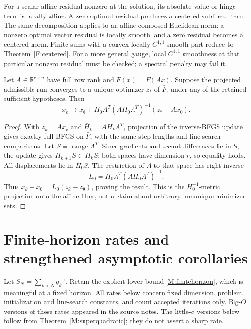 For a scalar affine residual nonzero at the solution, its absolute-value or hinge term is locally affine. A zero optimal residual produces a centered sublinear term. The same decomposition applies to an affine-composed Euclidean norm: a nonzero optimal vector residual is locally smooth, and a zero residual becomes a centered norm. Finite sums with a convex locally $C^{1,1}$ smooth part reduce to Theorem~\ref{F:centered}. For a more general gauge, local $C^{1,1}$ smoothness at that particular nonzero residual must be checked; a spectral penalty may fail it.

\begin{theorem}\label{F:lifting}
Let $A\in\mathbb R^{r\times n}$ have full row rank and $F(x)=\bar F(Ax)$. Suppose the projected admissible run converges to a unique optimizer $z_*$ of $\bar F$, under any of the retained sufficient hypotheses. Then
\[
 x_k\to x_0+H_0A^T(AH_0A^T)^{-1}(z_*-Ax_0).
\]
\end{theorem}
\begin{proof}
With $z_k=Ax_k$ and $\bar H_k=AH_kA^T$, projection of the inverse-BFGS update gives exactly full BFGS on $\bar F$, with the same step lengths and line-search comparisons. Let $S=\operatorname{range}A^T$. Since gradients and secant differences lie in $S$, the update gives $H_{k+1}S\subset H_kS$; both spaces have dimension $r$, so equality holds. All displacements lie in $H_0S$. The restriction of $A$ to that space has right inverse
\[
 L_0=H_0A^T(AH_0A^T)^{-1}.
\]
Thus $x_k-x_0=L_0(z_k-z_0)$, proving the result. This is the $H_0^{-1}$-metric projection onto the affine fiber, not a claim about arbitrary nonunique minimizer sets.
\end{proof}



\section{Finite-horizon rates and strengthened asymptotic corollaries}

Let $S_N=\sum_{k<N}q_k^{-1}$. Retain the explicit lower bound \eqref{M:finitehorizon}, which is meaningful at a fixed horizon. All rates below concern fixed dimension, problem, initialization and line-search constants, and count accepted iterations only. Big-$O$ versions of these rates appeared in the source notes. The little-$o$ versions below follow from Theorem~\ref{M:superquadratic}; they do not assert a sharp rate.

